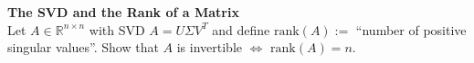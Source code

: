 \textbf{The SVD and the Rank of a Matrix}\\
Let $A \in \mathbb{R}^{n\times n}$ with SVD $A= U\Sigma V^T$ and define $\text{rank}(A) :=$ ``number of positive singular values''. Show that $A$ is invertible $\iff$ $\text{rank}(A) = n$.
 

